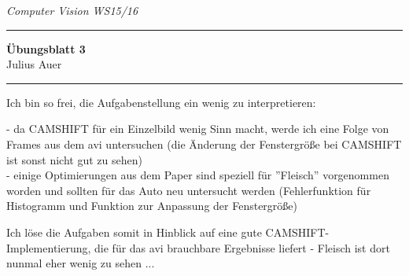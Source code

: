 \documentclass[a4paper, titlepage=false, parskip=full-, 10pt]{scrartcl}
\newcommand{\lecture}{Computer Vision WS15/16}
\newcommand{\tutor}{}
\newcommand{\assignmentnbr}{3}
\newcommand{\students}{Julius Auer}
\begin{document}
  
{\small \textsl{\lecture \hfill \tutor}}
\hrule
\begin{center}
\textbf{Übungsblatt \assignmentnbr}\\
[\bigskipamount]
{\small \students}
\end{center}
\hrule

Ich bin so frei, die Aufgabenstellung ein wenig zu interpretieren:

- da CAMSHIFT für ein Einzelbild wenig Sinn macht, werde ich eine Folge von Frames aus dem avi untersuchen (die Änderung der Fenstergröße bei CAMSHIFT ist sonst nicht gut zu sehen)\\
- einige Optimierungen aus dem Paper sind speziell für ''Fleisch'' vorgenommen worden und sollten für das Auto neu untersucht werden (Fehlerfunktion für Histogramm und Funktion zur Anpassung der Fenstergröße)

Ich löse die Aufgaben somit in Hinblick auf eine gute CAMSHIFT-Implementierung, die für das avi brauchbare Ergebnisse liefert - Fleisch ist dort nunmal eher wenig zu sehen ...
\end{document}
